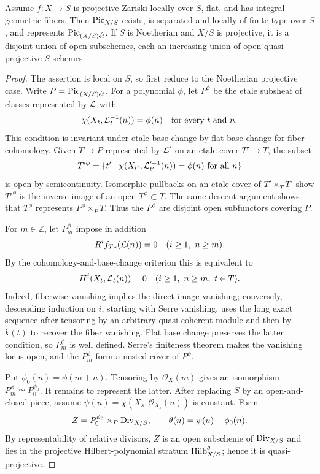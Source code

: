 \begin{theorem}\label{kps-thm-main}
Assume $f:X\to S$ is projective Zariski locally over $S$, flat, and has
integral geometric fibers. Then $\operatorname{Pic}_{X/S}$ exists, is separated and locally
of finite type over $S$, and represents $\operatorname{Pic}_{(X/S)\acute{\mathrm{e}t}}$. If $S$ is
Noetherian and $X/S$ is projective, it is a disjoint union of open subschemes,
each an increasing union of open quasi-projective $S$-schemes.
\end{theorem}
\begin{proof}
The assertion is local on $S$, so first reduce to the Noetherian projective
case. Write $P=\operatorname{Pic}_{(X/S)\acute{\mathrm{e}t}}$. For a polynomial $\phi$, let $P^\phi$
be the etale subsheaf of classes represented by $\mathcal L$ with
\[
  \chi(X_t,\mathcal L_t^{-1}(n))=\phi(n)\quad\text{for every }t\text{ and }n.
\]
This condition is invariant under etale base change by flat base change for
fiber cohomology. Given $T\to P$ represented by $\mathcal L'$ on an etale cover
$T'\to T$, the subset
\[
 T'^\phi=\{t'\mid \chi(X_{t'},\mathcal L_{t'}'^{-1}(n))=\phi(n)\text{ for all }n\}
\]
is open by semicontinuity. Isomorphic pullbacks on an etale cover of
$T'\times_TT'$ show $T'^\phi$ is the inverse image of an open $T^\phi\subset T$.
The same descent argument shows that $T^\phi$ represents
$P^\phi\times_PT$. Thus the $P^\phi$ are disjoint open subfunctors covering
$P$.

For $m\in\mathbb Z$, let $P_m^\phi$ impose in addition
\[
 R^if_{T*}(\mathcal L(n))=0\quad(i\ge1,\ n\ge m).
\]
By the cohomology-and-base-change criterion this is equivalent to
\[
 H^i(X_t,\mathcal L_t(n))=0\quad(i\ge1,\ n\ge m,\ t\in T).
\]
Indeed, fiberwise vanishing implies the direct-image vanishing; conversely,
descending induction on $i$, starting with Serre vanishing, uses the long exact
sequence after tensoring by an arbitrary quasi-coherent module and then by
$k(t)$ to recover the fiber vanishing. Flat base change preserves the latter
condition, so $P_m^\phi$ is well defined. Serre's finiteness theorem makes the
vanishing locus open, and the $P_m^\phi$ form a nested cover of $P^\phi$.

Put $\phi_0(n)=\phi(m+n)$. Tensoring by $\mathcal O_X(m)$ gives an isomorphism
$P_m^\phi\simeq P_0^{\phi_0}$. It remains to represent the latter. After
replacing $S$ by an open-and-closed piece, assume
$\psi(n)=\chi(X_s,\mathcal O_{X_s}(n))$ is constant. Form
\[
 Z=P_0^{\phi_0}\times_P\operatorname{Div}_{X/S},\qquad
 \theta(n)=\psi(n)-\phi_0(n).
\]
By representability of relative divisors, $Z$ is an open subscheme of
$\operatorname{Div}_{X/S}$ and lies in the projective Hilbert-polynomial stratum
$\operatorname{Hilb}_{X/S}^{\theta}$; hence it is quasi-projective.


\end{proof}
